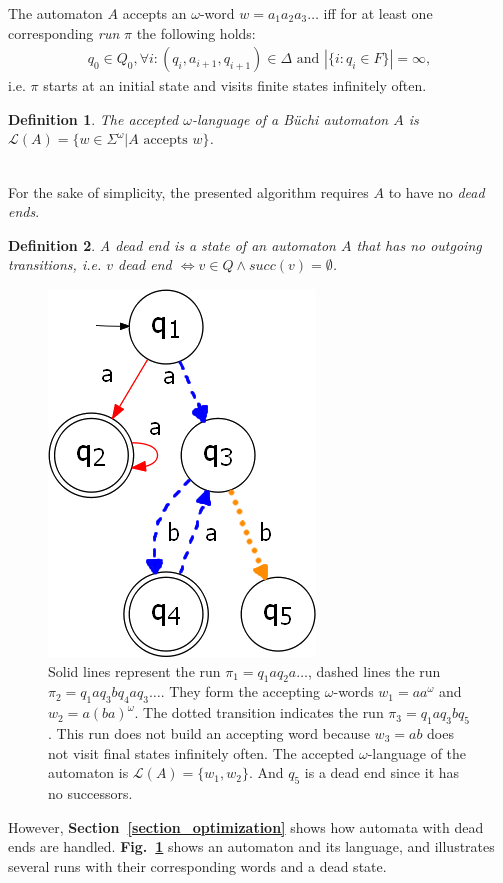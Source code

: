 \documentclass[12pt,oneside,bibliography=totoc,abstracton]{scrartcl}
\newcommand{\figref}[1]{\textbf{Fig.~\ref{#1}}}
\newcommand{\sectionref}[1]{\textbf{Section~\ref{#1}}}
\newtheorem{mydef}{Definition}
\begin{document}
The automaton $A$ accepts an $\omega$-word $w = a_1a_2a_3 \ldots$ iff for at least one corresponding \textit{run} $\pi$
the following holds:
\begin{align*}
	q_0 \in Q_0, \forall i: (q_i, a_{i + 1}, q_{i + 1}) \in \Delta \text{ and } |\{i : q_i \in F\}| = \infty,
\end{align*}
i.e. $\pi$ starts at an initial state and visits finite states infinitely often.\\
\begin{mydef}
	The accepted $\omega$-language of a Büchi automaton $A$ is\\
	$\mathcal{L}(A) = \{w \in \Sigma^\omega | A \text{ accepts } w\}$.
\end{mydef}\quad\\
For the sake of simplicity, the presented algorithm requires $A$ to have no \textit{dead ends}.\\
\begin{mydef}\label{def_deadend}
	A \textnormal{dead end} is a state of an automaton $A$ that has no outgoing transitions, i.e.
	$v$ \textnormal{dead end} $\Leftrightarrow v \in Q \land succ(v) = \emptyset$.\\
\end{mydef}
\begin{figure}[ht]
	 \begin{center}
		\includegraphics[scale=0.5]{res/run_language}
	\end{center}
	\caption{Solid lines represent the run $\pi_1 = q_1aq_2a\ldots$, dashed lines
		the run $\pi_2 = q_1aq_3bq_4aq_3\ldots$. They form the accepting $\omega$-words
		$w_1 = aa^\omega$ and $w_2 = a(ba)^\omega$.
		The dotted transition indicates the run $\pi_3 = q_1aq_3bq_5$. This run does not build
		an accepting word because $w_3 = ab$ does not visit final states infinitely often.
		The accepted $\omega$-language of the automaton is $\mathcal{L}(A) = \{w_1, w_2\}$.
		And $q_5$ is a dead end since it has no successors.}
	\label{run_language}
\end{figure}
However, \sectionref{section_optimization} shows how automata with dead ends are handled.
\figref{run_language} shows an automaton and its language, and illustrates several
runs with their corresponding words and a dead state.
\end{document}
